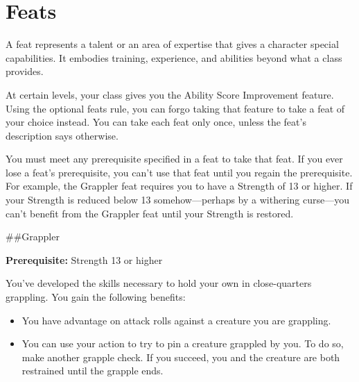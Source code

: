 \documentclass[
]{article}
\date{}
\begin{document}
\hypertarget{feats}{%
\section{Feats}\label{feats}}

A feat represents a talent or an area of expertise that gives a
character special capabilities. It embodies training, experience, and
abilities beyond what a class provides.

At certain levels, your class gives you the Ability Score Improvement
feature. Using the optional feats rule, you can forgo taking that
feature to take a feat of your choice instead. You can take each feat
only once, unless the feat's description says otherwise.

You must meet any prerequisite specified in a feat to take that feat. If
you ever lose a feat's prerequisite, you can't use that feat until you
regain the prerequisite. For example, the Grappler feat requires you to
have a Strength of 13 or higher. If your Strength is reduced below 13
somehow---perhaps by a withering curse---you can't benefit from the
Grappler feat until your Strength is restored.

\#\#Grappler

\textbf{Prerequisite:} Strength 13 or higher

You've developed the skills necessary to hold your own in close-quarters
grappling. You gain the following benefits:

\begin{itemize}
\item
  You have advantage on attack rolls against a creature you are
  grappling.
\item
  You can use your action to try to pin a creature grappled by you. To
  do so, make another grapple check. If you succeed, you and the
  creature are both restrained until the grapple ends.
\end{itemize}
\end{document}
